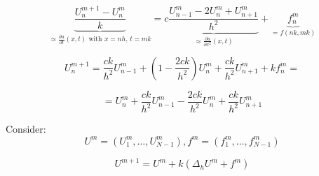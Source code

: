 \begin{equation*}
\underbrace{\frac{U_n^{m+1} - U_n^{m}}{k}}_{\approx \frac{\partial u}{\partial t}(x, t) \text{ with } x=nh,\,t=mk } = c \underbrace{\frac{U_{n-1}^{m} - 2U_n^{m} + U_{n+1}^{m}}{h^2}}_{\approx \frac{\partial u}{\partial x^2}(x, t)} + \underbrace{f_n^m}_{= f(nk, mk)}
\end{equation*}

\begin{equation*}
U_n^{m+1} = \frac{c k}{h^2} U_{n-1}^m + (1 - \frac{2 c k}{h^2}) U_n^m + \frac{c k}{h^2} U_{n+1}^m + k f_n^m =
\end{equation*}

\begin{equation*}
= U_n^m + \frac{ck}{h^2}U_{n-1}^m - \frac{2 c k}{h^2} U_n^m + \frac{c k}{h^2}U_{n+1}^m
\end{equation*}

Consider:
\begin{equation*}
U^m = (U_1^m, \dots, U_{N-1}^m), f^m = (f_1^m, \dots, f_{N-1}^m)
\end{equation*}

\begin{equation*}
U^{m+1} = U^m + k(\Delta_h U^m + f^m)
\end{equation*}

\begin{equation*}
\end{equation*}

\begin{equation*}
\end{equation*}

\begin{equation*}
\end{equation*}


\begin{equation*}
\end{equation*}

\begin{equation*}
\end{equation*}

\begin{equation*}
\end{equation*}

\begin{equation*}
\end{equation*}

\begin{equation*}
\end{equation*}

\begin{equation*}
\end{equation*}

